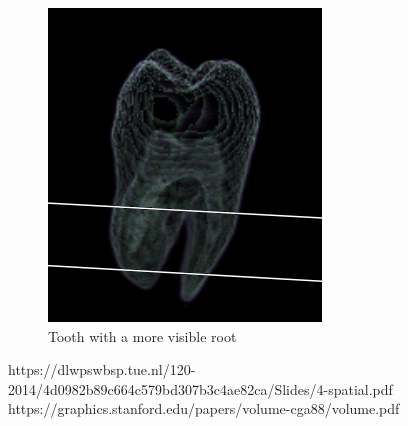 \documentclass[a4paper,twoside,11pt]{article}
\begin{document}
\begin{figure}[H]
  \includegraphics[width=\linewidth]{images/toothOp2}
  \caption{Tooth with a more visible root}\label{toothOp2}
\endminipage\hfill
 \end{figure}


\begin{thebibliography}{9}
https://dlwpswbsp.tue.nl/120-2014/4d0982b89c664c579bd307b3c4ae82ca/Slides/4-spatial.pdf
https://graphics.stanford.edu/papers/volume-cga88/volume.pdf
 \end{thebibliography}
\end{document}
